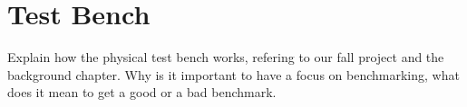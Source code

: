 \section{Test Bench}
Explain how the physical test bench works, refering to our fall project and the
background chapter. Why is it important to have a focus on benchmarking, what
does it mean to get a good or a bad benchmark.
